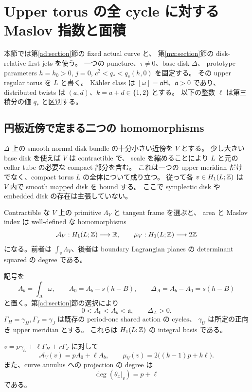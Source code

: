 \section{Upper torus の全 cycle に対する Maslov 指数と面積}
\label{ml:section}

本節では第\ref{ad:section}節の fixed actual curve と、
第\ref{mx:section}節の disk-relative first jets を使う。
一つの puncture、$\tau\ne0$、base disk $\Delta$、
prototype parameters $h=h_0>0$, $j=0$, $c^2<q_*<q_s(h,0)$ を固定する。
その upper regular torus を $L$ と書く。
Kähler class は $[\omega]=\mathfrak a\mathsf H$、$\mathfrak a>0$ であり、
distributed twists は $(a,d)$、$k=a+d\in\{1,2\}$ とする。
以下の整数 $\ell$ は第三積分の値 $q_*$ と区別する。

\subsection{円板近傍で定まる二つの homomorphisms}

$\Delta$ 上の smooth normal disk bundle の十分小さい近傍を $V$ とする。
少し大きい base disk を使えば $V$ は contractible で、
scale を縮めることにより $L$ と元の collar tube の必要な compact 部分を含む。
これは一つの upper meridian だけでなく、compact torus $L$ の全体について成り立つ。
従って各 $v\in H_1(L;\mathbb Z)$ は $V$ 内で smooth mapped disk を bound する。
ここで symplectic disk や embedded disk の存在は主張していない。

Contractible な $V$ 上の primitive $\Lambda_V$ と tangent frame を選ぶと、
area と Maslov index は well-defined な homomorphisms
\[
 \mathcal A_V:H_1(L;\mathbb Z)\longrightarrow\mathbb R,
 \qquad
 \mu_V:H_1(L;\mathbb Z)\longrightarrow2\mathbb Z
\]
になる。前者は $\int_v\Lambda_V$、後者は boundary Lagrangian planes の
determinant squared の degree である。

記号を
\[
 A_b=\int_\Delta\omega,\qquad
 A_0=A_b-s(h-B),\qquad
 \Delta_A=A_b-A_0=s(h-B)
\]
と置く。第\ref{ad:section}節の選択により
\begin{equation}\label{ml:areas}
 0<A_0<A_b<\mathfrak a,\qquad \Delta_A>0.
\end{equation}
$\Gamma_H=\gamma_H,\Gamma_J=\gamma_J$ は既存の period-one shared action の cycles、
$\gamma_U$ は所定の正向き upper meridian とする。
これらは $H_1(L;\mathbb Z)$ の integral basis である。

\begin{proposition}
\label{ml:full-cycle}
$v=p\gamma_U+\ell\Gamma_H+r\Gamma_J$ に対して
\begin{equation}\label{ml:local-covectors}
 \boxed{\quad
 \mathcal A_V(v)=pA_0+\ell A_b,
 \qquad
 \mu_V(v)=2\bigl((k-1)p+k\ell\bigr).
 \quad}
\end{equation}
また、curve annulus への projection の degree は
\begin{equation}\label{ml:base-degree}
 \deg(\theta_x|_v)=p+\ell
\end{equation}
である。
\end{proposition}

